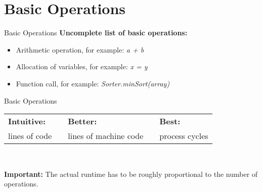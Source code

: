 \section{Basic Operations}

\begin{frame}{Basic Operations}
  \textbf{Uncomplete list of basic operations:}
  \begin{center}
    \begin{itemize}
      \item
        Arithmetic operation, for example: \textit{a + b}
      \item
        Allocation of variables, for example: \textit{x = y}
      \item
        Function call, for example: \textit{Sorter.minSort(array)}
    \end{itemize}
  \end{center}
\end{frame}


\begin{frame}{Basic Operations}
  \begin{tabularx}{\textwidth}{@{}XcXcX@{}}
    \cellcolor{MainA} {\color{white}\textbf{Intuitive:}} &
    {} &
    \cellcolor{MainA} {\color{white}\textbf{Better:}} &
    {} &
    \cellcolor{MainA} {\color{white}\textbf{Best:}}\\[0.5em]
    \rule{0pt}{1.25em}\cellcolor{MainALight}lines of code &
    {} &
    \cellcolor{MainALight}lines of machine code &
    {} &
    \cellcolor{MainALight}process cycles
  \end{tabularx}\\[1.5em]
  \begin{alertblock}{\textbf{Important:}}
    The actual runtime has to be roughly proportional
    to the number of operations.
  \end{alertblock}
\end{frame}